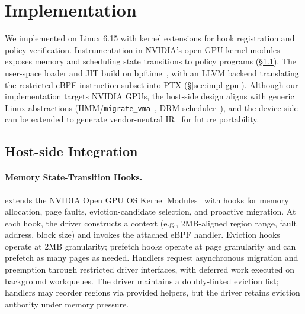 
\section{Implementation}
\label{sec:implementation}

We implemented \sys on Linux 6.15 with kernel extensions for hook registration and policy verification.
Instrumentation in NVIDIA's open GPU kernel modules exposes memory and scheduling state transitions to policy programs (\S\ref{sec:impl-host}).
The user-space loader and JIT build on bpftime~\cite{bpftime}, with an LLVM backend translating the restricted eBPF instruction subset into PTX (\S\ref{sec:impl-gpu}).
Although our implementation targets NVIDIA GPUs, the host-side design aligns with generic Linux abstractions (HMM/\texttt{migrate\_vma}~\cite{rocm-gpu-memory,linux-gpusvm-doc}, DRM scheduler~\cite{drm-gpu-sched,amdgpu-userq-doc}), and the device-side can be extended to generate vendor-neutral IR~\cite{spirv-ir-rfc} for future portability.

\subsection{Host-side Integration}
\label{sec:impl-host}
\paragraph{Memory State-Transition Hooks.}
\sys extends the NVIDIA Open GPU OS Kernel Modules~\cite{nvidia-open-gpu} with hooks for memory allocation, page faults, eviction-candidate selection, and proactive migration.
At each hook, the driver constructs a context (e.g., 2MB-aligned region range, fault address, block size) and invokes the attached eBPF handler.
Eviction hooks operate at 2MB granularity; prefetch hooks operate at page granularity and can prefetch as many pages as needed.
Handlers request asynchronous migration and preemption through restricted driver interfaces, with deferred work executed on background workqueues.
The driver maintains a doubly-linked eviction list; handlers may reorder regions via provided helpers, but the driver retains eviction authority under memory pressure.

